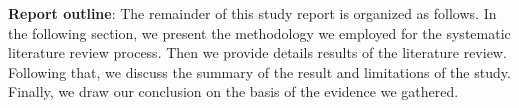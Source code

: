 %     
    

\textbf{Report outline}:
The remainder of this study report is organized as follows. In the following section, we present the methodology we employed for the systematic literature review process. Then we provide details results of the literature review. Following that, we discuss the summary of the result and limitations of the study. Finally, we draw our conclusion on the basis of the evidence we gathered.   

